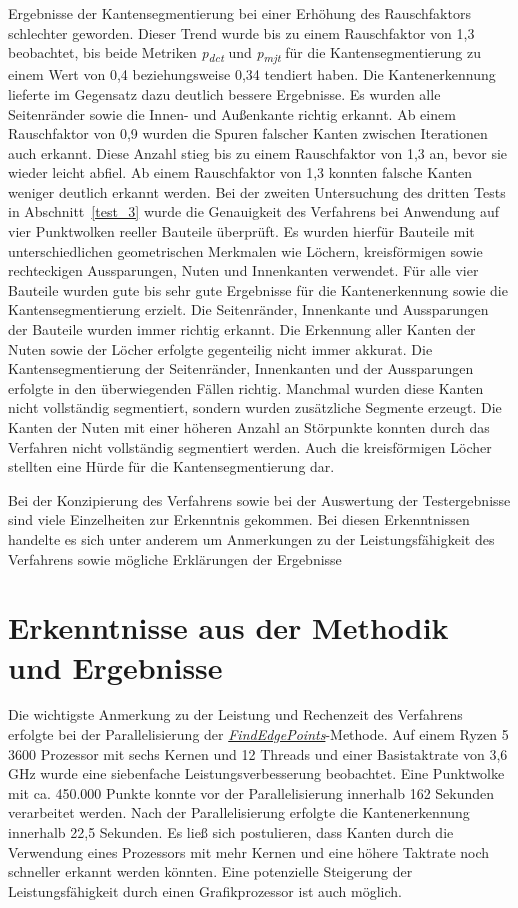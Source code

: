 Ergebnisse der Kantensegmentierung bei einer Erhöhung des Rauschfaktors schlechter geworden. Dieser Trend wurde bis zu einem Rauschfaktor von 1,3 beobachtet, bis beide Metriken \textit{p\textsubscript{dct}} und \textit{p\textsubscript{mjt}} für die Kantensegmentierung zu einem Wert von 0,4 beziehungsweise 0,34 tendiert haben. Die Kantenerkennung lieferte im Gegensatz dazu deutlich bessere Ergebnisse. Es wurden alle Seitenränder sowie die Innen- und Außenkante richtig erkannt. Ab einem Rauschfaktor von 0,9 wurden die Spuren falscher Kanten zwischen Iterationen auch erkannt. Diese Anzahl stieg bis zu einem Rauschfaktor von 1,3 an, bevor sie wieder leicht abfiel. Ab einem Rauschfaktor von 1,3 konnten falsche Kanten weniger deutlich erkannt werden. Bei der zweiten Untersuchung des dritten Tests in Abschnitt~\ref{test_3} wurde die Genauigkeit des Verfahrens bei Anwendung auf vier Punktwolken reeller Bauteile überprüft. Es wurden hierfür Bauteile mit unterschiedlichen geometrischen Merkmalen wie Löchern, kreisförmigen sowie rechteckigen Aussparungen, Nuten und Innenkanten verwendet. Für alle vier Bauteile wurden gute bis sehr gute Ergebnisse für die Kantenerkennung sowie die Kantensegmentierung erzielt. Die Seitenränder, Innenkante und Aussparungen der Bauteile wurden immer richtig erkannt. Die Erkennung aller Kanten der Nuten sowie der Löcher erfolgte gegenteilig nicht immer akkurat. Die Kantensegmentierung der Seitenränder, Innenkanten und der Aussparungen erfolgte in den überwiegenden Fällen richtig. Manchmal wurden diese Kanten nicht vollständig segmentiert, sondern wurden zusätzliche Segmente erzeugt. Die Kanten der Nuten mit einer höheren Anzahl an Störpunkte konnten durch das Verfahren nicht vollständig segmentiert werden. Auch die kreisförmigen Löcher stellten eine Hürde für die Kantensegmentierung dar. 

Bei der Konzipierung des Verfahrens sowie bei der Auswertung der Testergebnisse sind viele Einzelheiten zur Erkenntnis gekommen. Bei diesen Erkenntnissen handelte es sich unter anderem um Anmerkungen zu der Leistungsfähigkeit des Verfahrens sowie mögliche Erklärungen der Ergebnisse

\section{Erkenntnisse aus der Methodik und Ergebnisse} \label{Erkenntnisse}

Die wichtigste Anmerkung zu der Leistung und Rechenzeit des Verfahrens erfolgte bei der Parallelisierung der \textit{\hyperref[alg:find_edge_points]{FindEdgePoints}}-Methode. Auf einem Ryzen 5 3600 Prozessor \autocite{noauthor_amd_2022} mit sechs Kernen und 12 Threads und einer Basistaktrate von 3,6 GHz wurde eine siebenfache Leistungsverbesserung beobachtet. Eine Punktwolke mit ca. 450.000 Punkte konnte vor der Parallelisierung innerhalb 162 Sekunden verarbeitet werden. Nach der Parallelisierung erfolgte die Kantenerkennung innerhalb 22,5 Sekunden. Es ließ sich postulieren, dass Kanten durch die Verwendung eines Prozessors mit mehr Kernen und eine höhere Taktrate noch schneller erkannt werden könnten. Eine potenzielle Steigerung der Leistungsfähigkeit durch einen Grafikprozessor ist auch möglich.

